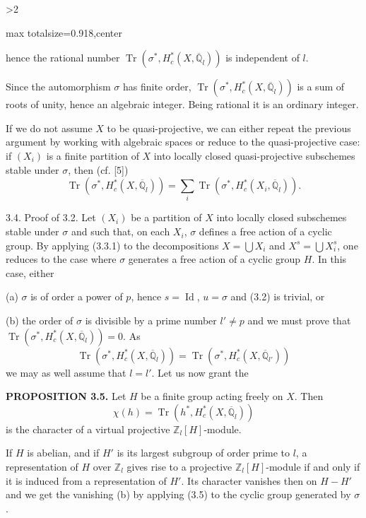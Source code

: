 \documentclass[9pt,twoside]{extarticle}
\newcommand{\EditionPage}[3]{%
  \ifnum#1>2\clearpage\fi
  \pdfbookmark[1]{Printed page #2}{en-folio-#2}%
  \hypertarget{en-physical-#1}{}%
  \noindent\begin{adjustbox}{max totalsize={\textwidth}{0.918\textheight},center}
  \begin{minipage}[t]{\textwidth}
  \fontsize{9.4}{11.1}\selectfont\justifying
  #3
  \end{minipage}
  \end{adjustbox}%
}
\begin{document}
\EditionPage{19}{120}{%
hence the rational number \(\operatorname{Tr}(\sigma^*,H_c^*(X,\overline{\mathbb Q}_l))\) is independent of \(l\).\par

Since the automorphism \(\sigma\) has finite order, \(\operatorname{Tr}(\sigma^*,H_c^*(X,\overline{\mathbb Q}_l))\) is a sum of roots of unity, hence an algebraic integer. Being rational it is an ordinary integer.\par

If we do not assume \(X\) to be quasi-projective, we can either repeat the previous argument by working with algebraic spaces or reduce to the quasi-projective case: if \((X_i)\) is a finite partition of \(X\) into locally closed quasi-projective subschemes stable under \(\sigma\), then (cf. [5]) \[
\tag{3.3.1}
\operatorname{Tr}(\sigma^*,H_c^*(X,\overline{\mathbb Q}_l))
=
\sum_i\operatorname{Tr}(\sigma^*,H_c^*(X_i,\overline{\mathbb Q}_l)).
\]\par

3.4. Proof of 3.2. Let \((X_i)\) be a partition of \(X\) into locally closed subschemes stable under \(\sigma\) and such that, on each \(X_i\), \(\sigma\) defines a free action of a cyclic group. By applying (3.3.1) to the decompositions \(X=\bigcup X_i\) and \(X^s=\bigcup X_i^s\), one reduces to the case where \(\sigma\) generates a free action of a cyclic group \(H\). In this case, either\par

(a) \(\sigma\) is of order a power of \(p\), hence \(s=\operatorname{Id}\), \(u=\sigma\) and (3.2) is trivial, or\par

(b) the order of \(\sigma\) is divisible by a prime number \(l'\ne p\) and we must prove that \(\operatorname{Tr}(\sigma^*,H_c^*(X,\overline{\mathbb Q}_l))=0\). As \[
\operatorname{Tr}(\sigma^*,H_c^*(X,\overline{\mathbb Q}_l))
=
\operatorname{Tr}(\sigma^*,H_c^*(X,\overline{\mathbb Q}_{l'}))
\tag{3.3}
\] we may as well assume that \(l=l'\). Let us now grant the\par

\noindent\textbf{PROPOSITION 3.5.} Let \(H\) be a finite group acting freely on \(X\). Then \[
\chi(h)=\operatorname{Tr}(h^*,H_c^*(X,\overline{\mathbb Q}_l))
\] is the character of a virtual projective \(\mathbb Z_l[H]\)-module.\par

If \(H\) is abelian, and if \(H'\) is its largest subgroup of order prime to \(l\), a representation of \(H\) over \(\mathbb Z_l\) gives rise to a projective \(\mathbb Z_l[H]\)-module if and only if it is induced from a representation of \(H'\). Its character vanishes then on \(H-H'\) and we get the vanishing (b) by applying (3.5) to the cyclic group generated by \(\sigma\).\par

}
\end{document}
